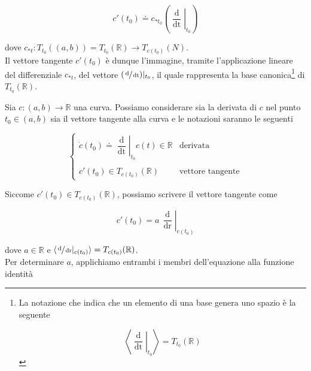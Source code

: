 \begin{equation}
	c'(t_{0}) \doteq c_{*t_{0}} \left( \left. \dfrac{\operatorname{d}}{\operatorname{dt}} \right|_{t_{0}} \right)
\end{equation}

dove $ c_{*t} : T_{t_{0}}((a,b)) = T_{t_{0}}(\mathbb{R}) \to T_{c(t_{0})}(N) $.\\
Il vettore tangente $ c'(t_{0}) $ è dunque l'immagine, tramite l'applicazione lineare del differenziale $ c_{*t} $, del vettore $ (\sfrac{\operatorname{d}}{\operatorname{dt}}) |_{t_{0}} $, il quale rappresenta la base canonica\footnote{%
	La notazione che indica che un elemento di una base genera uno spazio è la seguente
	
	\begin{equation}
		\left\langle \left. \dfrac{\operatorname{d}}{\operatorname{dt}} \right|_{t_{0}} \right\rangle = T_{t_{0}}(\mathbb{R})
	\end{equation}%
} di $ T_{t_{0}}(\mathbb{R}) $.

\begin{remark}
	Sia $ c : (a,b) \to \mathbb{R} $ una curva. Possiamo considerare sia la derivata di $ c $ nel punto $ t_{0} \in (a,b) $ sia il vettore tangente alla curva e le notazioni saranno le seguenti
	
	\begin{equation}
		\begin{cases}
			\dot{c}(t_{0}) \doteq \left. \dfrac{\operatorname{d}}{\operatorname{dt}} \right|_{t_{0}} c(t) \in \mathbb{R} & \text{derivata}\\\\
			c'(t_{0}) \in T_{c(t_{0})}(\mathbb{R}) & \text{vettore tangente}
		\end{cases}
	\end{equation}
\end{remark}

Siccome $ c'(t_{0}) \in T_{c(t_{0})}(\mathbb{R}) $, possiamo scrivere il vettore tangente come

\begin{equation}
	c'(t_{0}) = a \, \left. \dfrac{\operatorname{d}}{\operatorname{dr}} \right|_{c(t_{0})}
\end{equation}

dove $ a \in \mathbb{R} $ e $ \langle \sfrac{\operatorname{d}}{\operatorname{dr}} |_{c(t_{0})} \rangle = T_{c(t_{0})}(\mathbb{R}) $.\\
Per determinare $ a $, applichiamo entrambi i membri dell'equazione alla funzione identità

